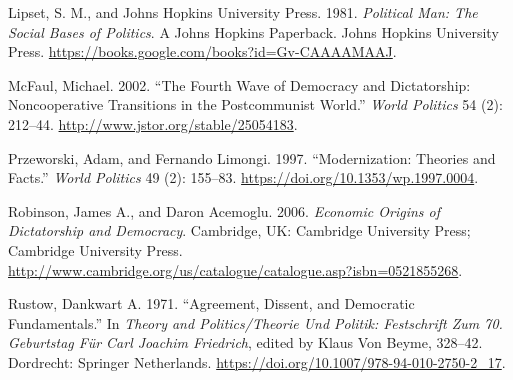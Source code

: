 \documentclass[12pt,]{article}
\begin{document}
\leavevmode\hypertarget{ref-lipset}{}%
Lipset, S. M., and Johns Hopkins University Press. 1981. \emph{Political
Man: The Social Bases of Politics}. A Johns Hopkins Paperback. Johns
Hopkins University Press.
\url{https://books.google.com/books?id=Gv-CAAAAMAAJ}.

\leavevmode\hypertarget{ref-mcfaul}{}%
McFaul, Michael. 2002. ``The Fourth Wave of Democracy and Dictatorship:
Noncooperative Transitions in the Postcommunist World.'' \emph{World
Politics} 54 (2): 212--44. \url{http://www.jstor.org/stable/25054183}.

\leavevmode\hypertarget{ref-przeworski}{}%
Przeworski, Adam, and Fernando Limongi. 1997. ``Modernization: Theories
and Facts.'' \emph{World Politics} 49 (2): 155--83.
\url{https://doi.org/10.1353/wp.1997.0004}.

\leavevmode\hypertarget{ref-robinson}{}%
Robinson, James A., and Daron Acemoglu. 2006. \emph{Economic Origins of
Dictatorship and Democracy}. Cambridge, UK: Cambridge University Press;
Cambridge University Press.
\url{http://www.cambridge.org/us/catalogue/catalogue.asp?isbn=0521855268}.

\leavevmode\hypertarget{ref-rustow}{}%
Rustow, Dankwart A. 1971. ``Agreement, Dissent, and Democratic
Fundamentals.'' In \emph{Theory and Politics/Theorie Und Politik:
Festschrift Zum 70. Geburtstag Für Carl Joachim Friedrich}, edited by
Klaus Von Beyme, 328--42. Dordrecht: Springer Netherlands.
\url{https://doi.org/10.1007/978-94-010-2750-2_17}.





\newpage
\singlespacing 
\end{document}

